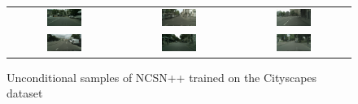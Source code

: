 \begin{figure} \label{fig:5.5}
    \tiny
    \centering
    \setlength\tabcolsep{-2pt}
    \begin{tabular}{ccc}
        \includegraphics[width=0.33\textwidth]{Chapters/figures/experiments/cityscapes/1_uncond_sample.png} & 
        \includegraphics[width=0.33\textwidth]{Chapters/figures/experiments/cityscapes/3_uncond_sample.png} & 
        \includegraphics[width=0.33\textwidth]{Chapters/figures/experiments/cityscapes/8_uncond_sample.png}\\
        \includegraphics[width=0.33\textwidth]{Chapters/figures/experiments/cityscapes/6_uncond_sample.png} & 
        \includegraphics[width=0.33\textwidth]{Chapters/figures/experiments/cityscapes/10_uncond_sample.png} & 
        \includegraphics[width=0.33\textwidth]{Chapters/figures/experiments/cityscapes/18_uncond_sample.png} \\
    \end{tabular}
    \caption{Unconditional samples of NCSN++ trained on the Cityscapes dataset}
\end{figure}
%

